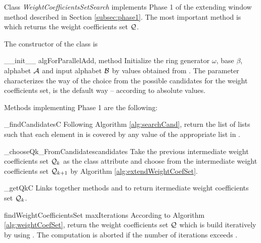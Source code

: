 Class \emph{WeightCoefficientsSetSearch} implements Phase 1 of the extending window method described in Section \ref{subsec:phase1}. The most important method is   which returns the weight coefficients set $\mathcal{Q}$.

The constructor of the class is 

\begin{method}{\_\_init\_\_}{ algForParallelAdd, method}
Initialize the ring generator $\omega$, base $\beta$, alphabet $\mathcal{A}$ and input alphabet $\mathcal{B}$ by values obtained from . The parameter  characterizes the way of the choice from the possible candidates for the weight coefficients set,  is the default way -- according to absolute values.  
\end{method}

Methods implementing Phase 1 are the following:

\begin{method}{\_findCandidates}{C}
Following Algorithm \ref{alg:searchCand}, return the list of lists  such that each element in  is covered by any value of the appropriate list in .  
\end{method}


\begin{method}{\_chooseQk\_FromCandidates}{candidates}
Take the previous intermediate weight coefficients set $\mathcal{Q}_{k}$ as the class attribute and choose from  the intermediate weight coefficients set $\mathcal{Q}_{k+1}$ by Algorithm \ref{alg:extendWeightCoefSet}.
\end{method}


\begin{method}{\_getQk}{C}
Links together methods  and  to return itermediate weight coefficients set $\mathcal{Q}_k$.
\end{method}


\begin{method}{findWeightCoefficientsSet}{ maxIterations}
According to Algorithm \ref{alg:weightCoefSet}, return the weight coefficients set $\mathcal{Q}$ which is build iteratively by using . The computation is aborted if the number of iterations exceeds . 
\end{method}

